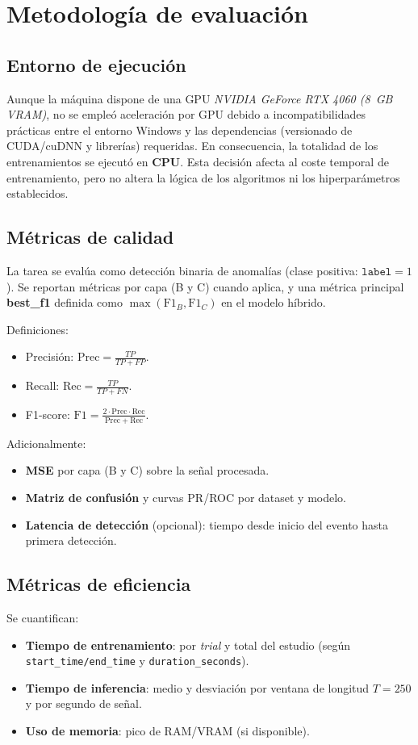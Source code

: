 \section{Metodología de evaluación}

\subsection{Entorno de ejecución} \label{subsec:entorno}
 Aunque la máquina dispone de una GPU \textit{ NVIDIA GeForce RTX 4060 (8~GB VRAM)}, no se empleó aceleración por GPU debido a incompatibilidades prácticas entre el entorno Windows y las dependencias (versionado de CUDA/cuDNN y librerías) requeridas. En consecuencia, la totalidad de los entrenamientos se ejecutó en \textbf{CPU}. Esta decisión afecta al coste temporal de entrenamiento, pero no altera la lógica de los algoritmos ni los hiperparámetros establecidos.

\subsection{Métricas de calidad}
La tarea se evalúa como detección binaria de anomalías (clase positiva: \(\texttt{label} = 1\)). Se reportan métricas por capa (B y C) cuando aplica, y una métrica principal \textbf{best\_f1} definida como \(\max(\text{F1}_B, \text{F1}_C)\) en el modelo híbrido.

Definiciones:
\begin{itemize}
    \item Precisión: \(\mathrm{Prec} = \frac{TP}{TP + FP}\).
    \item Recall: \(\mathrm{Rec} = \frac{TP}{TP + FN}\).
    \item F1-score: \(\mathrm{F1} = \frac{2 \cdot \mathrm{Prec} \cdot \mathrm{Rec}}{\mathrm{Prec} + \mathrm{Rec}}\).
\end{itemize}

Adicionalmente:
\begin{itemize}
    \item \textbf{MSE} por capa (B y C) sobre la señal procesada.
    \item \textbf{Matriz de confusión} y curvas PR/ROC por dataset y modelo.
    \item \textbf{Latencia de detección} (opcional): tiempo desde inicio del evento hasta primera detección.
\end{itemize}

\subsection{Métricas de eficiencia}
Se cuantifican:
\begin{itemize}
    \item \textbf{Tiempo de entrenamiento}: por \textit{trial} y total del estudio (según \texttt{start\_time/end\_time} y \texttt{duration\_seconds}).
    \item \textbf{Tiempo de inferencia}: medio y desviación por ventana de longitud \(T=250\) y por segundo de señal.
    \item \textbf{Uso de memoria}: pico de RAM/VRAM (si disponible).
\end{itemize}

